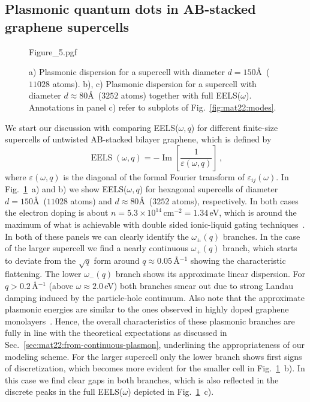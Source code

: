 \subsection{Plasmonic quantum dots in AB-stacked graphene supercells}
    
\begin{figure}
    \centering
    {Figure_5.pgf}
    \caption{a) Plasmonic dispersion for a supercell with diameter $d=150$\AA\ ($11028$ atoms). b), c) Plasmonic dispersion for a supercell with diameter $d\approx80$\AA\ ($3252$ atoms) together with full EELS($\omega$). Annotations in panel c) refer to subplots of Fig.~\ref{fig:mat22:modes}.}
    \label{fig:mat22:EELS}
\end{figure}
        
We start our discussion with comparing EELS($\omega,q$) for different finite-size supercells of untwisted AB-stacked bilayer graphene, which is defined by
\begin{equation*}
    \operatorname{EELS}(\omega, q) = -\operatorname{Im}\left[ \frac{1}{\varepsilon(\omega, q)} \right] \,,
\end{equation*}
where $\varepsilon(\omega, q)$ is the diagonal of the formal Fourier transform of $\varepsilon_{ij}(\omega)$. In Fig.~\ref{fig:mat22:EELS}~a) and b) we show EELS($\omega,q$) for hexagonal supercells of diameter $d=150$\AA\ ($11028$ atoms) and $d\approx80$\AA\ ($3252$ atoms), respectively. In both cases the electron doping is about $n = 5.3\times10^{14}\,$cm$^{-2} = 1.34\,$eV, which is around the maximum of what is achievable with double sided ionic-liquid gating techniques~\cite{zheliuk_josephson_2019}. In both of these panels we can clearly identify the $\omega_\pm(q)$ branches. In the case of the larger supercell we find a nearly continuous $\omega_+(q)$ branch, which starts to deviate from the $\sqrt{q}$ form around $q\approx 0.05\,$\AA$^{-1}$ showing the characteristic flattening. The lower $\omega_-(q)$ branch shows its approximate linear dispersion. For $q >0.2\,$\AA$^{-1}$ (above $\omega \approx 2.0\,$eV) both branches smear out due to strong Landau damping induced by the particle-hole continuum. Also note that the approximate plasmonic energies are similar to the ones observed in highly doped graphene monolayers~\cite{shin_control_2011}. Hence, the overall characteristics of these plasmonic branches are fully in line with the theoretical expectations as discussed in Sec.~\ref{sec:mat22:from-continuous-plasmon}, underlining the appropriateness of our modeling scheme. For the larger supercell only the lower branch shows first signs of discretization, which becomes more evident for the smaller cell in Fig.~\ref{fig:mat22:EELS}~b). In this case we find clear gaps in both branches, which is also reflected in the discrete peaks in the full EELS($\omega$) depicted in Fig.~\ref{fig:mat22:EELS}~c).

